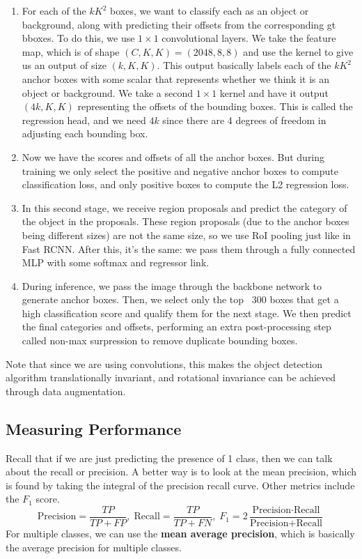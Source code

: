 \documentclass{article}
\begin{document}
\begin{enumerate}
        \item For each of the $k K^2$ boxes, we want to classify each as an object or background, along with predicting their offsets from the corresponding gt bboxes. To do this, we use $1 \times 1$ convolutional layers. We take the feature map, which is of shape $(C, K, K) = (2048, 8, 8)$ and use the kernel to give us an output of size $(k, K, K)$. This output basically labels each of the $k K^2$ anchor boxes with some scalar that represents whether we think it is an object or background. We take a second $1 \times 1$ kernel and have it output $(4k, K, K)$ representing the offsets of the bounding boxes. This is called the regression head, and we need $4k$ since there are 4 degrees of freedom in adjusting each bounding box. 
        
        \item Now we have the scores and offsets of all the anchor boxes. But during training we only select the positive and negative anchor boxes to compute classification loss, and only positive boxes to compute the L2 regression loss. 

        \item In this second stage, we receive region proposals and predict the category of the object in the proposals. These region proposals (due to the anchor boxes being different sizes) are not the same size, so we use RoI pooling just like in Fast RCNN. After this, it's the same: we pass them through a fully connected MLP with some softmax and regressor link. 

        \item During inference, we pass the image through the backbone network to generate anchor boxes. Then, we select only the top ~300 boxes that get a high classification score and qualify them for the next stage. We then predict the final categories and offsets, performing an extra post-processing step called non-max surpression to remove duplicate bounding boxes. 
    \end{enumerate}

    Note that since we are using convolutions, this makes the object detection algorithm translationally invariant, and rotational invariance can be achieved through data augmentation. 

  \subsection{Measuring Performance} 

    Recall that if we are just predicting the presence of 1 class, then we can talk about the recall or precision. A better way is to look at the mean precision, which is found by taking the integral of the precision recall curve. Other metrics include the $F_1$ score. 
    \[\text{Precision} = \frac{TP}{TP + FP}, \; \text{Recall} = \frac{TP}{TP + FN}, \; F_1 = 2 \frac{\text{Precision} \cdot \text{Recall}}{\text{Precision} + \text{Recall}}\]
    For multiple classes, we can use the \textbf{mean average precision}, which is basically the average precision for multiple classes.
\end{document}
